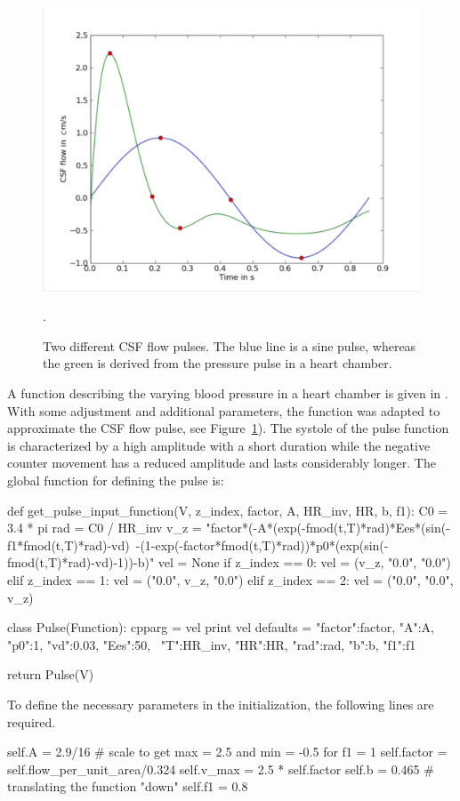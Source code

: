 \begin{figure}\begin{center}
\includegraphics[width=\largefig]{chapters/hentschel/pdf/sin_pulse.pdf}
\caption{Two different CSF flow pulses. The blue line is a sine pulse,
    whereas the green is derived from the pressure pulse in a heart chamber.}
\label{fig:sin_pulse}.
\end{center}\end{figure}

A function describing the varying blood pressure in a heart chamber is
given in \citet{SmithChase2ShawEtAl2006}.  With some adjustment and
additional parameters, the function was adapted to approximate the CSF
flow pulse, see Figure~\ref{fig:sin_pulse}).  The systole of the pulse
function is characterized by a high amplitude with a short duration
while the negative counter movement has a reduced amplitude and lasts
considerably longer.  The global function for defining the pulse is:
\begin{python}
def get_pulse_input_function(V, z_index, factor, A, HR_inv, HR, b, f1):
	C0 = 3.4 * pi
	rad = C0 / HR_inv
	v_z = "factor*(-A*(exp(-fmod(t,T)*rad)*Ees*(sin(-f1*fmod(t,T)*rad)-vd)\
	       -(1-exp(-factor*fmod(t,T)*rad))*p0*(exp(sin(-fmod(t,T)*rad)-vd)-1))-b)"
	vel = None
	if z_index == 0:
		vel = (v_z, "0.0", "0.0")
	elif z_index == 1:
		vel = ("0.0", v_z, "0.0")
	elif z_index == 2:
		vel = ("0.0", "0.0", v_z)

	class Pulse(Function):
		cpparg = vel
		print vel
		defaults = {"factor":factor, "A":A, "p0":1, "vd":0.03, "Ees":50, \
		            "T":HR_inv, "HR":HR, "rad":rad, "b":b, "f1":f1}

	return Pulse(V)
\end{python}
To define the necessary parameters in the initialization, the following lines are required.
\begin{python}
self.A = 2.9/16	# scale to get max = 2.5 and min = -0.5 for f1 = 1
self.factor = self.flow_per_unit_area/0.324
self.v_max = 2.5 * self.factor
self.b = 0.465 	# translating the function "down"
self.f1 = 0.8
\end{python}

